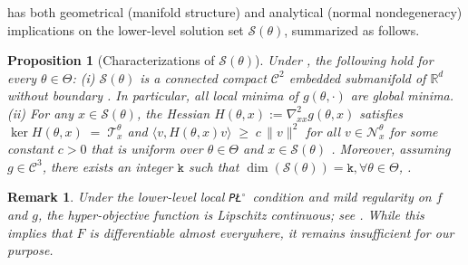 \documentclass{article}
\theoremstyle{normaltheorem}
\newtheorem{proposition}[proposition]{Proposition}
\newtheorem{remark}[remark]{Remark}
\newcommand{\PLcirc}{\texttt{P\L$^\circ$}}
\newcommand{\dimk}{\texttt{k}}
\newcommand{\R}{\mathbb{R}}
\newcommand{\calS}{\mathcal{S}}
\newcommand{\calT}{\mathcal{T}}
\newcommand{\calN}{\mathcal{N}}
\begin{document}
 has both geometrical (manifold structure) and analytical (normal nondegeneracy) implications on the lower-level solution set $\calS(\theta)$, summarized as follows.






\begin{proposition}[Characterizations of $\calS(\theta)$]\label{prop:geometry}
Under , the following hold for every \(\theta\in\Theta\):
(i) \(\calS(\theta)\) is a connected compact \(\mathcal{C}^{2}\) embedded submanifold of \(\R^{d}\) without boundary
\citep[Prop.~3, Cor.~1]{gong2024poincare}. In particular, all local minima of \(g(\theta,\cdot)\) are global minima.
(ii) For any \(x\in\calS(\theta)\), the Hessian \(H(\theta,x):=\nabla_{xx}^{2} g(\theta,x)\) satisfies $\ker H(\theta,x) \;=\; \calT_x^\theta$ and $\langle v, H(\theta,x)v\rangle \;\ge\; c\,\|v\|^2$ for all $v\in \calN_x^\theta$
	for some constant \(c>0\) that is uniform over \(\theta\in\Theta\) and \(x\in\calS(\theta)\) \citep[Cor.~2.17]{rebjock2024fast}.
Moreover, assuming $g\in \mathcal{C}^{3}$, there exists an integer \(\dimk\) such that
\(
\dim(\calS(\theta))=\dimk, \forall \theta\in\Theta
\), \citep[Lem.~3.5]{masiha2025superquantile}.
\end{proposition}
\begin{remark}
Under the lower-level local \PLcirc\ condition and mild regularity on $f$ and $g$, the hyper-objective function is Lipschitz continuous; see
\citep[Lem.~3.2]{masiha2025superquantile}. 
While this implies that $F$ is differentiable almost everywhere, it remains insufficient for our purpose.  
\end{remark}
\end{document}
